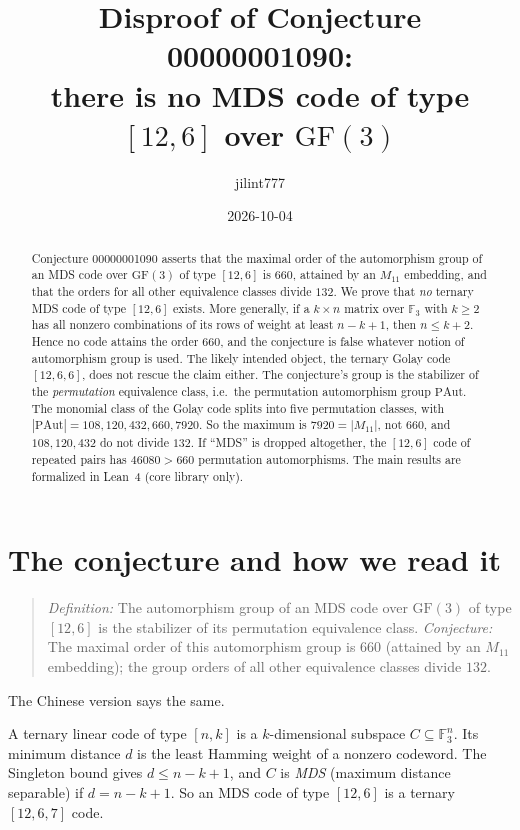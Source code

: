 \documentclass[11pt]{article}
\title{Disproof of Conjecture 00000001090:\\
there is no MDS code of type $[12,6]$ over $\mathrm{GF}(3)$}
\author{jilint777}
\date{2026-10-04}
\theoremstyle{remark}
\newcommand{\F}{\mathbb{F}_3}
\begin{document}
\sloppy
\maketitle

\begin{abstract}
Conjecture 00000001090 asserts that the maximal order of the automorphism group
of an MDS code over $\mathrm{GF}(3)$ of type $[12,6]$ is $660$, attained by an
$M_{11}$ embedding, and that the orders for all other equivalence classes divide
$132$. We prove that \emph{no} ternary MDS code of type $[12,6]$ exists. More
generally, if a $k\times n$ matrix over $\F$ with $k\ge2$ has all nonzero
combinations of its rows of weight at least $n-k+1$, then $n\le k+2$. Hence
no code attains the order $660$, and the conjecture is false whatever notion of
automorphism group is used. The likely intended object, the ternary Golay code
$[12,6,6]$, does not rescue the claim either. The conjecture's group is the
stabilizer of the \emph{permutation} equivalence class, i.e.\ the permutation
automorphism group $\mathrm{PAut}$. The monomial class of the Golay code splits
into five permutation classes, with $|\mathrm{PAut}|=108,120,432,660,7920$. So the
maximum is $7920=|M_{11}|$, not $660$, and $108,120,432$ do not divide $132$. If
``MDS'' is dropped altogether, the $[12,6]$ code of repeated pairs has
$46080>660$ permutation automorphisms. The main results are formalized in
Lean~4 (core library only).
\end{abstract}

\section{The conjecture and how we read it}
\begin{quote}
\emph{Definition:} The automorphism group of an MDS code over $\mathrm{GF}(3)$
of type $[12,6]$ is the stabilizer of its permutation equivalence class.
\emph{Conjecture:} The maximal order of this automorphism group is $660$
(attained by an $M_{11}$ embedding); the group orders of all other equivalence
classes divide $132$.
\end{quote}
The Chinese version says the same.

A ternary linear code of type $[n,k]$ is a $k$-dimensional subspace
$C\subseteq\F^n$. Its minimum distance $d$ is the least Hamming weight of a
nonzero codeword. The Singleton bound gives $d\le n-k+1$, and $C$ is
\emph{MDS} (maximum distance separable) if $d=n-k+1$. So an MDS code of type
$[12,6]$ is a ternary $[12,6,7]$ code.
\end{document}
